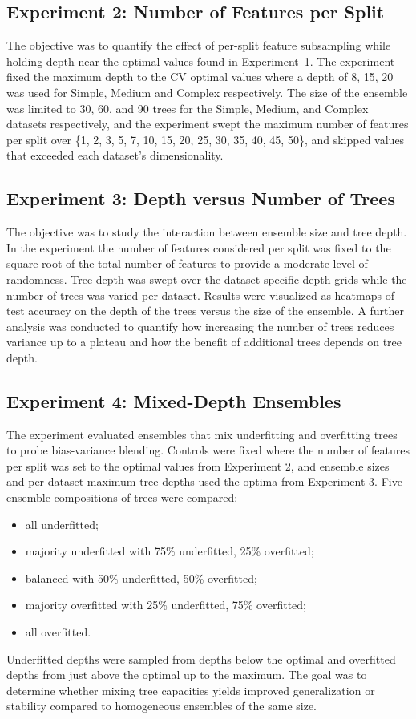 \documentclass[conference]{IEEEtran}
\begin{document}
\subsection{Experiment 2: Number of Features per Split}
The objective was to quantify the effect of per-split feature subsampling while holding depth near the optimal values found in Experiment~1. The experiment fixed the maximum depth to the CV optimal values where a depth of 8, 15, 20 was used for Simple, Medium and Complex respectively. The size of the ensemble was limited to 30, 60, and 90 trees for the Simple, Medium, and Complex datasets respectively, and the experiment swept the maximum number of features per split over \{1, 2, 3, 5, 7, 10, 15, 20, 25, 30, 35, 40, 45, 50\}, and skipped values that exceeded each dataset's dimensionality.

\subsection{Experiment 3: Depth versus Number of Trees}
The objective was to study the interaction between ensemble size and tree depth. In the experiment the number of features considered per split was fixed to the square root of the total number of features to provide a moderate level of randomness. Tree depth was swept over the dataset-specific depth grids while the number of
  trees was varied per dataset. Results were visualized as heatmaps of test accuracy on the depth of the trees versus the size of the ensemble. A further analysis was conducted to quantify how increasing the number of trees reduces variance up to a plateau and how the benefit of additional trees depends on tree depth.

\subsection{Experiment 4: Mixed-Depth Ensembles}
The experiment evaluated ensembles that mix underfitting and overfitting trees to probe bias-variance blending. Controls were fixed where the number of features per split was set to the optimal values from Experiment 2, and ensemble sizes and per-dataset maximum tree depths used the optima from Experiment 3.
Five ensemble compositions of trees were compared:
\begin{itemize}
  \item all underfitted;
  \item majority underfitted with 75\% underfitted, 25\% overfitted;
  \item balanced with 50\% underfitted, 50\% overfitted;
  \item majority overfitted with 25\% underfitted, 75\% overfitted;
  \item all overfitted. 
\end{itemize}
Underfitted depths were sampled from depths below the optimal and overfitted depths from just above the optimal up to the maximum. The goal was to determine whether mixing tree capacities yields improved generalization or stability compared to homogeneous ensembles of the same size.
\end{document}
